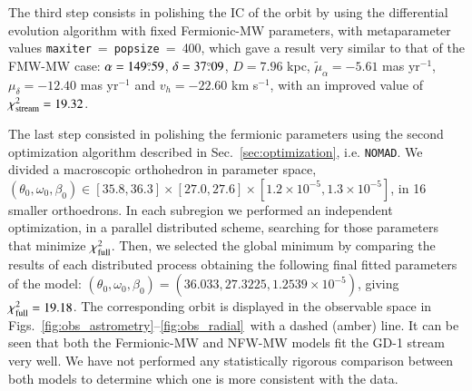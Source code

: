 \documentclass[twocolumn]{aa}
\begin{document}
The third step consists in polishing the IC of the orbit by using the differential evolution algorithm with fixed Fermionic-MW parameters, with metaparameter values \texttt{maxiter}$~=~$\texttt{popsize}$~=~$400, which gave a result very similar to that of the FMW-MW case:
$\alpha=149\overset{\circ}{.} 59$, $\delta=37\overset{\circ}{.} 09$, $D=7.96$ kpc,
$\tilde{\mu}_\alpha=-5.61$ mas yr$^{-1}$, $\mu_\delta=-12.40$ mas yr$^{-1}$ and $v_h=-22.60$ km s$^{-1}$, with an improved value of $\chi^2_{\rm{stream}}= 19.32$.

The last step consisted in polishing the fermionic parameters using the second optimization algorithm described in Sec.~\ref{sec:optimization}, i.e. \texttt{NOMAD}. We divided a  macroscopic orthohedron in parameter space, $(\theta_0, \omega_0, \beta_0) \in [35.8, 36.3]\times[27.0, 27.6]\times [1.2\times10^{-5}, 1.3\times10^{-5}]$, in 16 smaller orthoedrons. In each subregion we performed an independent optimization, in a parallel distributed scheme, searching for those parameters that minimize $\chi^2_{\rm{full}}$. Then, we selected the global minimum by comparing the results of each distributed process obtaining the following final fitted parameters of the model: $(\theta_0, \omega_0, \beta_0)= (36.033, 27.3225, 1.2539\times10^{-5})$, giving $\chi^2_{\rm{full}}= 19.18$.
The corresponding orbit is displayed in the observable space in
Figs.~\ref{fig:obs_astrometry}--\ref{fig:obs_radial}~with a dashed (amber) line. It can be seen that both the Fermionic-MW and NFW-MW models fit the GD-1 stream very well.
We have not performed any statistically rigorous comparison between both models to determine which one is more consistent with the data.
%
\end{document}
